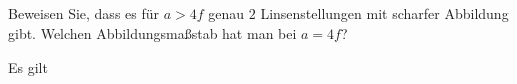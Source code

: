 \subsection{}
Beweisen Sie, dass es für $a > 4f$ genau $2$ Linsenstellungen mit scharfer Abbildung
gibt. 
Welchen Abbildungsmaßstab hat man bei $a = 4f$?

Es gilt